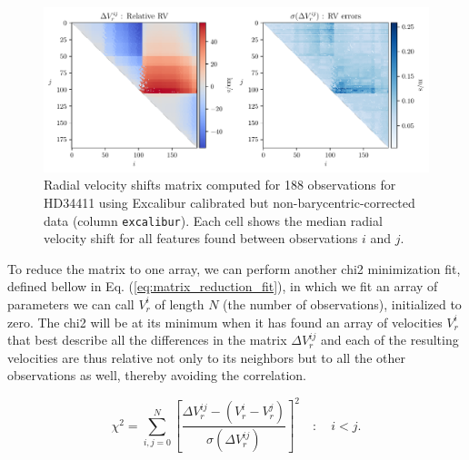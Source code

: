     \begin{figure}%
        \begin{wide}  
            \includegraphics[width=\textwidth]{figures/shfits_matrix_non_bary.pdf}
            \caption{Radial velocity shifts matrix computed for 188 observations for HD34411 using Excalibur calibrated but non-barycentric-corrected data (column \texttt{excalibur}). Each cell shows the median radial velocity shift for all features found between observations $i$ and $j$.}
        \label{fig:shift_matrix}
        \end{wide}
    \end{figure}
            
    To reduce the matrix to one array, we can perform another chi2 minimization fit, defined bellow in Eq. (\ref{eq:matrix_reduction_fit}), in which we fit an array of parameters we can call $V_r^i$ of length $N$ (the number of observations), initialized to zero. The chi2 will be at its minimum when it has found an array of velocities $V_r^i$ that best describe all the differences in the matrix $\Delta V_r^{ij}$ and each of the resulting velocities are thus relative not only to its neighbors but to all the other observations as well, thereby avoiding the correlation.
    
    \begin{equation}
        \label{eq:matrix_reduction_fit}
        \chi^{2}=\sum_{i,j = 0}^{N}\left[\frac{ \Delta V_{r}^{ij} - (V_r^i - V_r^j) }{\sigma(\Delta V_{r}^{ij})}\right]^{2} \quad : \quad i < j.
    \end{equation}

